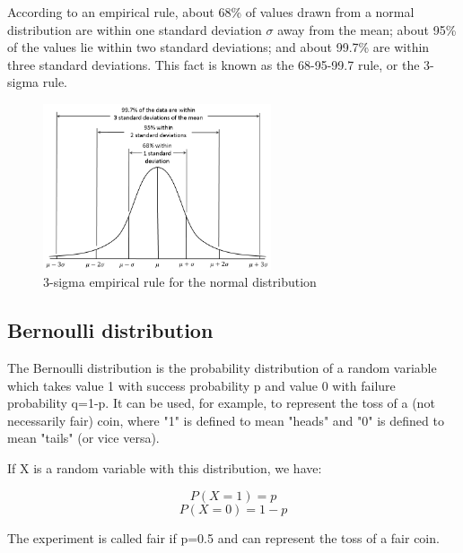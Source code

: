 According to an empirical rule, about 68\% of values drawn from a normal distribution are within one standard deviation \(\sigma\) away from the mean; 
about 95\% of the values lie within two standard deviations; and about 99.7\% are within three standard deviations. This fact is known as the 68-95-99.7 
rule, or the 3-sigma rule.

\begin{figure}[H]
  \centering
  \includegraphics[width=0.6\textwidth]{figures/Empirical_Rule.PNG}
  \caption{3-sigma empirical rule for the normal distribution \cite{23} }
\end{figure}

\subsection{Bernoulli distribution}

The Bernoulli distribution is the probability distribution of a random variable which takes value 1 with success probability p and value 0 with failure 
probability q=1-p. It can be used, for example, to represent the toss of a (not necessarily fair) coin, where "1" is defined to mean "heads" and "0" is 
defined to mean "tails" (or vice versa).

If X is a random variable with this distribution, we have:

\[P(X=1) = p\]
\[P(X=0) = 1-p\]

The experiment is called fair if p=0.5 and can represent the toss of a fair coin. 
















